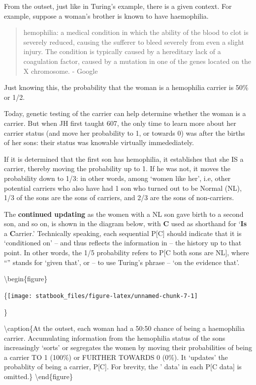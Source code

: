 \documentclass[]{book}
\begin{document}
From the outset, just like in Turing's example, there is a given context. For example, suppose a woman's brother is known to have haemophilia.

\begin{quote}
hemophilia: a medical condition in which the ability of the blood to clot is severely reduced, causing the sufferer to bleed severely from even a slight injury. The condition is typically caused by a hereditary lack of a coagulation factor, caused by a mutation in one of the genes located on the X chromosome. - Google
\end{quote}

Just knowing this, the probability that the woman is a hemophilia carrier is 50\% or 1/2.

Today, genetic testing of the carrier can help determine whether the woman is a carrier. But when JH first taught 607, the only time to learn more about her carrier status (and move her probability to 1, or towards 0) was after the births of her sons: their status was knowable virtually immedediately.

If it is determined that the first son has hemophilia, it establishes that she IS a carrier, thereby moving the probability up to 1. If he was not, it moves the probability down to 1/3: in other words, among `women like her', i.e, other potential carriers who also have had 1 son who turned out to be Normal (NL), 1/3 of the sons are the sons of carriers, and 2/3 are the sons of non-carriers.

The \textbf{continued updating} as the women with a NL son gave birth to a second son, and so on, is shown in the diagram below, with \textbf{C} used as shorthand for `\textbf{Is} a \textbf{C}arrier.' Technically speaking, each sequential P{[}C{]} should indicate that it is `conditioned on' -- and thus reflects the information in -- the history up to that point. In other words, the 1/5 probability refers to P{[}C \textbar{} both sons are NL{]}, where ``\textbar{}'' stands for `given that', or -- to use Turing's phrase -- `on the evidence that'.

\textbackslash{}begin\{figure\}

\{\centering \texttt{[image: statbook\_files/figure-latex/unnamed-chunk-7-1]}

\}

\textbackslash{}caption\{At the outset, each woman had a 50:50 chance of being a haemophilia carrier. Accumulating information from the hemophilia status of the sons increasingly `sorts' or segregates the women by moving their probabilities of being a carrier TO 1 (100\%) or FURTHER TOWARDS 0 (0\%). It `updates' the probablity of being a carrier, P{[}C{]}. For brevity, the ' \textbar{} data' in each P{[}C \textbar{} data{]} is omitted.\}\label{fig:unnamed-chunk-7}
\textbackslash{}end\{figure\}
\end{document}
